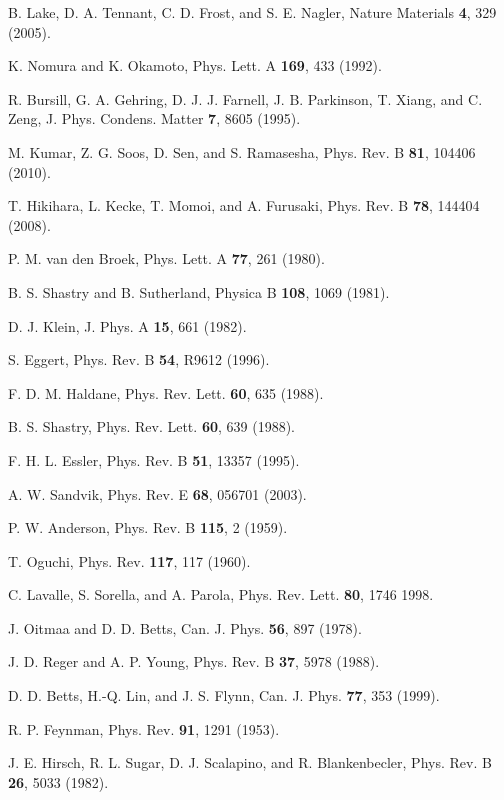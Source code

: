 \documentclass[draft,numberedheadings]{aipproc}
\begin{document}
\begin{thebibliography}{999}
B. Lake, D. A. Tennant, C. D. Frost, and S. E. Nagler, Nature Materials {\bf 4}, 329 (2005).

K. Nomura and K. Okamoto, Phys. Lett. A {\bf 169}, 433 (1992).

R. Bursill, G. A. Gehring, D. J. J. Farnell, J. B. Parkinson, T. Xiang, and C. Zeng, 
J. Phys. Condens. Matter {\bf 7}, 8605 (1995).

M. Kumar, Z. G. Soos, D. Sen, and S. Ramasesha, Phys. Rev. B {\bf 81}, 104406 (2010).

T. Hikihara, L. Kecke, T. Momoi, and A. Furusaki, Phys. Rev. B {\bf 78}, 144404 (2008). 

P. M. van den Broek, Phys. Lett. A {\bf 77}, 261 (1980).

B. S. Shastry and B. Sutherland, Physica B {\bf 108}, 1069 (1981).

D. J. Klein, J. Phys. A {\bf 15}, 661 (1982).

S. Eggert, Phys. Rev. B {\bf 54}, R9612 (1996).

F. D. M. Haldane, Phys. Rev. Lett. {\bf 60}, 635 (1988).

B. S. Shastry, Phys. Rev. Lett. {\bf 60}, 639 (1988).

F. H. L. Essler, Phys. Rev. B {\bf 51}, 13357 (1995). 

A. W. Sandvik, Phys. Rev. E {\bf 68}, 056701 (2003).

P. W. Anderson, Phys. Rev. B {\bf 115}, 2 (1959).

T. Oguchi, Phys. Rev. {\bf 117}, 117 (1960).

C. Lavalle, S. Sorella, and A. Parola, Phys. Rev. Lett. {\bf 80}, 1746 1998.

J. Oitmaa and D. D. Betts, Can. J. Phys. {\bf 56}, 897 (1978).

J. D. Reger and A. P. Young, Phys. Rev. B {\bf 37}, 5978 (1988).

D. D. Betts, H.-Q. Lin, and J. S. Flynn, Can. J. Phys. {\bf 77}, 353 (1999).

R. P. Feynman, Phys. Rev. {\bf 91}, 1291 (1953).

J. E. Hirsch, R. L. Sugar, D. J. Scalapino, and R. Blankenbecler,
Phys. Rev. B {\bf 26}, 5033 (1982).


\end{thebibliography}
\end{document}
